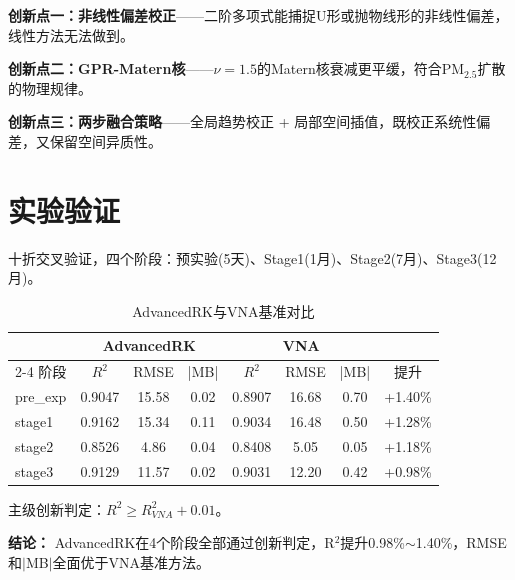 \documentclass[UTF8, a4paper, 12pt]{article}
\begin{document}
\textbf{创新点一：非线性偏差校正}——二阶多项式能捕捉U形或抛物线形的非线性偏差，线性方法无法做到。

\textbf{创新点二：GPR-Matern核}——$\nu=1.5$的Matern核衰减更平缓，符合PM$_{2.5}$扩散的物理规律。

\textbf{创新点三：两步融合策略}——全局趋势校正 + 局部空间插值，既校正系统性偏差，又保留空间异质性。

\section{实验验证}

十折交叉验证，四个阶段：预实验(5天)、Stage1(1月)、Stage2(7月)、Stage3(12月)。

\begin{table}[htbp]
\centering
\caption{AdvancedRK与VNA基准对比}
\begin{tabular}{@{}lccccccc@{}}
\toprule
 & \multicolumn{3}{c}{AdvancedRK} & \multicolumn{3}{c}{VNA} \\
\cmidrule{2-4} \cmidrule{5-7}
阶段 & $R^2$ & RMSE & |MB| & $R^2$ & RMSE & |MB| & 提升 \\
\midrule
pre\_exp & 0.9047 & 15.58 & 0.02 & 0.8907 & 16.68 & 0.70 & +1.40\% \\
stage1 & 0.9162 & 15.34 & 0.11 & 0.9034 & 16.48 & 0.50 & +1.28\% \\
stage2 & 0.8526 & 4.86 & 0.04 & 0.8408 & 5.05 & 0.05 & +1.18\% \\
stage3 & 0.9129 & 11.57 & 0.02 & 0.9031 & 12.20 & 0.42 & +0.98\% \\
\bottomrule
\end{tabular}
\end{table}

主级创新判定：$R^2 \geq R^2_{VNA} + 0.01$。

\textbf{结论：} AdvancedRK在4个阶段全部通过创新判定，R$^2$提升0.98\%$\sim$1.40\%，RMSE和$|$MB$|$全面优于VNA基准方法。
\end{document}

